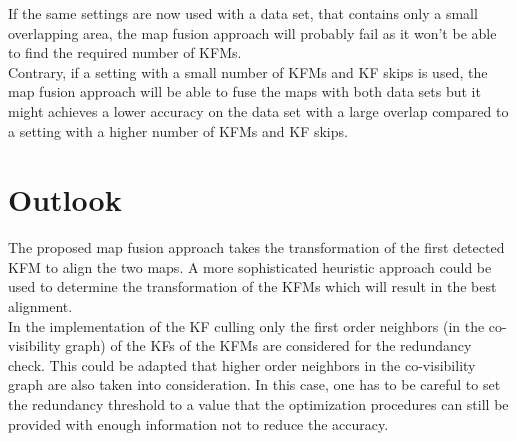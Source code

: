 If the same settings are now used with a data set, that contains only a small overlapping area, the map fusion approach will probably fail as it won't be able to find the required number of \acp{KFM}.\\

Contrary, if a setting with a small number of \acp{KFM} and \ac{KF} skips is used, the map fusion approach will be able to fuse the maps with both data sets but it might achieves a lower accuracy on the data set with a large overlap compared to a setting with a higher number of \acp{KFM} and \ac{KF} skips.

\section{Outlook}

The proposed map fusion approach takes the transformation of the first detected \ac{KFM} to align the two maps. A more sophisticated heuristic approach could be used to determine the transformation of the \acp{KFM} which will result in the best alignment.\\

In the implementation of the \ac{KF} culling only the first order neighbors (in the co-visibility graph) of the \acp{KF} of the \acp{KFM} are considered for the redundancy check. This could be adapted that higher order neighbors in the co-visibility graph are also taken into consideration. In this case, one has to be careful to set the redundancy threshold to a value that the optimization procedures can still be provided with enough information not to reduce the accuracy.
